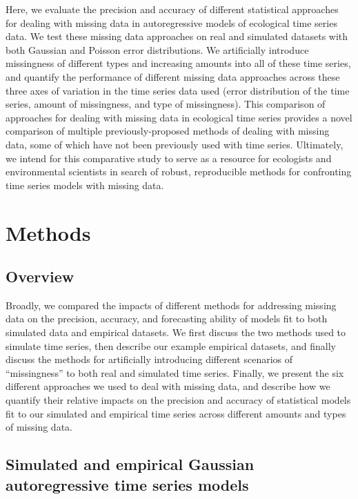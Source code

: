 \documentclass{article}
\begin{document}
\begin{linenumbers}
Here, we evaluate the precision and accuracy of different statistical approaches for dealing with missing data in autoregressive models of ecological time series data. We test these missing data approaches on real and simulated datasets with both Gaussian and Poisson error distributions. We artificially introduce missingness of different types and increasing amounts into all of these time series, and quantify the performance of different missing data approaches across these three axes of variation in the time series data used (error distribution of the time series, amount of missingness, and type of missingness). This comparison of approaches for dealing with missing data in ecological time series provides a novel comparison of multiple previously-proposed methods of dealing with missing data, some of which have not been previously used with time series. Ultimately, we intend for this comparative study to serve as a resource for ecologists and environmental scientists in search of robust, reproducible methods for confronting time series models with missing data.


\section*{Methods} 

\subsection*{Overview}

Broadly, we compared the impacts of different methods for addressing missing data on the precision, accuracy, and forecasting ability of models fit to both simulated data and empirical datasets. We first discuss the two methods used to simulate time series, then describe our example empirical datasets, and finally discuss the methods for artificially introducing different scenarios of ``missingness'' to both real and simulated time series. Finally, we present the six different approaches we used to deal with missing data, and describe how we quantify their relative impacts on the precision and accuracy of statistical models fit to our simulated and empirical time series across different amounts and types of missing data. 

\subsection*{Simulated and empirical Gaussian autoregressive time series models}


\end{linenumbers}
\end{document}
